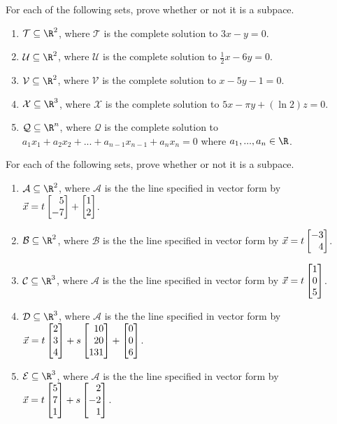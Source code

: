 \begin{exercises}
	\begin{problist}

		\prob For each of the following sets, prove whether or not it is a subpace.
		\begin{enumerate}
			\item  $\mathcal T \subseteq \R^2$, where $\mathcal T$ is the complete solution to $3x-y=0$.
			\item  $\mathcal U \subseteq \R^2$, where $\mathcal U$ is the complete solution to $\frac{1}{2}x-6y=0$.
			\item  $\mathcal V \subseteq \R^2$, where $\mathcal V$ is the complete solution to $x-5y-1=0$.
			\item  $\mathcal X \subseteq \R^3$, where $\mathcal X$ is the complete solution to
			$5x-\pi y + (\ln 2)z=0$.
			\item $\mathcal Q \subseteq \R^n$, where $\mathcal Q$ is the complete solution to
			$a_1x_1+a_2x_2+...+a_{n-1}x_{n-1}+a_nx_n=0$ where $a_1,...,a_n \in \R$.
		\end{enumerate}
		\begin{solution}
		
		\end{solution}
		
		\prob For each of the following sets, prove whether or not it is a subpace.
		\begin{enumerate}
			\item $\mathcal A \subseteq \R^2$, where $\mathcal A$ is the the line specified in vector form by
			$\vec x = t\mat{5\\-7}+\mat{1\\2}$.
			\item $\mathcal B \subseteq \R^2$, where $\mathcal B$ is  the the line specified  in vector form by
			$\vec x = t\mat{-3\\4}$.
			\item $\mathcal C \subseteq \R^3$, where $\mathcal A$ is  the the line specified  in vector form by
			$\vec x = t\mat{1\\0\\5}$.
			\item $\mathcal D \subseteq \R^3$, where $\mathcal A$ is  the the line specified  in vector form by
			$\vec x = t\mat{2\\3\\4}+s\mat{10\\20\\131}+\mat{0\\0\\6}$.
			\item $\mathcal E \subseteq \R^3$, where $\mathcal A$ is  the the line specified  in vector form by
			$\vec x = t\mat{5\\7\\1}+s\mat{2\\-2\\1}$.
		\end{enumerate}
		\begin{solution}
		

\end{solution}
\end{problist}
\end{exercises}
